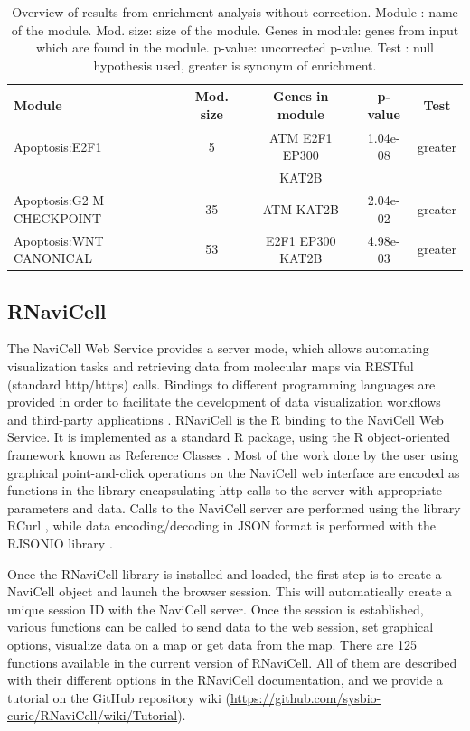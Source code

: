 \documentclass[article]{jss}
\begin{document}
\begin{table}[h!]
  \centering
  \caption{Overview of results from enrichment analysis without correction.
  Module : name of the module. Mod. size: size of the module. Genes in module:
  genes from input which are found in the module. p-value: uncorrected p-value.
  Test : null hypothesis used, greater is synonym of enrichment.}
  \label{tab:table2}

  \begin{tabular}{l|c|c|c|c}
	\hline
Module & Mod. size & Genes in module & p-value & Test\\
	\hline
Apoptosis:E2F1 & 5 &  ATM E2F1 EP300 & 1.04e-08 & greater \\
               &   &  KAT2B                 &          &         \\
Apoptosis:G2 M CHECKPOINT & 35  & ATM KAT2B & 2.04e-02 & greater \\
Apoptosis:WNT CANONICAL & 53 & E2F1 EP300 KAT2B  & 4.98e-03 & greater \\
	\hline
	\end{tabular}
\end{table}




\subsection{RNaviCell}

The NaviCell Web Service provides a server mode, which allows automating
visualization tasks and retrieving data from molecular maps via RESTful
(standard http/https) calls. Bindings to different programming languages are
provided in order to facilitate the development of data visualization workflows and
third-party applications \citep{bonnet2015navicell}. RNaviCell is the R binding
to the NaviCell Web Service. It is implemented as a standard R package, using
the R object-oriented framework known as Reference Classes \citep{hwR5}. Most
of the work done by the user using graphical point-and-click operations on the
NaviCell web interface are encoded as functions in the library encapsulating
http calls to the server with appropriate parameters and data. Calls to the
NaviCell server are performed using the library RCurl \citep{rcurl2015}, while
data encoding/decoding in JSON format is performed with the RJSONIO library
\citep{rjsonio2014}.

Once the RNaviCell library is installed and loaded, the first step is to create
a NaviCell object and launch the browser session. This will automatically create
a unique session ID with the NaviCell server. Once the session is established,
various functions can be called to send data to the web session, set graphical
options, visualize data on a map or get data from the map. There are 125
functions available in the current version of RNaviCell. All of them are
described with their different options in the RNaviCell documentation, and we
provide a tutorial on the GitHub repository wiki
(\url{https://github.com/sysbio-curie/RNaviCell/wiki/Tutorial}).  
\end{document}
